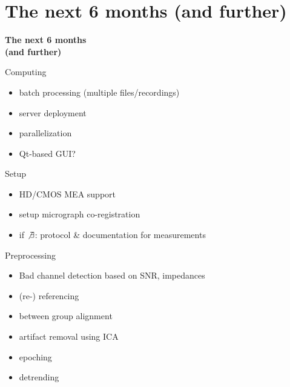 \documentclass[10pt]{beamer}
\begin{document}
\section{The next 6 months (and further)}
\begin{frame}
\begin{center}
 \begin{Huge}
  \textbf{The next 6 months \\(and further)}
 \end{Huge}
 \end{center}
\end{frame}

\begin{frame}{Computing}
\begin{itemize}
  \item batch processing (multiple files/recordings) \\ [2em]
  \item server deployment \\ [2em]
  \item parallelization \\ [2em]
  \item Qt-based GUI?
  \end{itemize}
\end{frame}
  
\begin{frame}{Setup}
  \begin{itemize}
   \item HD/CMOS MEA support \\ [2em]
   \item setup micrograph co-registration \\ [2em]
   \item if $\not\exists$: protocol \& documentation for measurements
  \end{itemize}
\end{frame}

\begin{frame}{Preprocessing}
  \begin{itemize}
   \item Bad channel detection based on SNR, impedances \\ [1em]
   \item (re-) referencing \\ [1em]
   \item between group alignment \\ [1em]
   \item artifact removal using ICA \\ [1em]
   \item epoching \\ [1em]
   \item detrending
  \end{itemize}
\end{frame}
\end{document}
